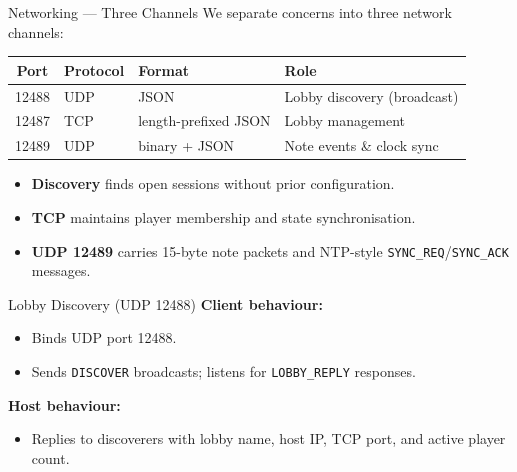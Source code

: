 \documentclass[t]{beamer}
\begin{document}
\begin{frame}{Networking — Three Channels}
We separate concerns into three network channels:

\vspace{0.3cm}
\begin{table}
\centering
\small
\begin{tabular}{clll}
\toprule
\textbf{Port} & \textbf{Protocol} & \textbf{Format} & \textbf{Role} \\
\midrule
12488 & UDP & JSON & Lobby discovery (broadcast) \\
12487 & TCP & length-prefixed JSON & Lobby management \\
12489 & UDP & binary + JSON & Note events \& clock sync \\
\bottomrule
\end{tabular}
\end{table}

\vspace{0.3cm}
\begin{itemize}
    \item \textbf{Discovery} finds open sessions without prior configuration.
    \item \textbf{TCP} maintains player membership and state synchronisation.
    \item \textbf{UDP 12489} carries 15-byte note packets and NTP-style \texttt{SYNC\_REQ}/\texttt{SYNC\_ACK} messages.
\end{itemize}
\end{frame}

\begin{frame}{Lobby Discovery (UDP 12488)}
\textbf{Client behaviour:}
\begin{itemize}
    \item Binds UDP port 12488.
    \item Sends \texttt{DISCOVER} broadcasts; listens for \texttt{LOBBY\_REPLY} responses.
\end{itemize}

\vspace{0.3cm}
\textbf{Host behaviour:}
\begin{itemize}
    \item Replies to discoverers with lobby name, host IP, TCP port, and active player count.
\end{itemize}

\end{frame}
\end{document}
